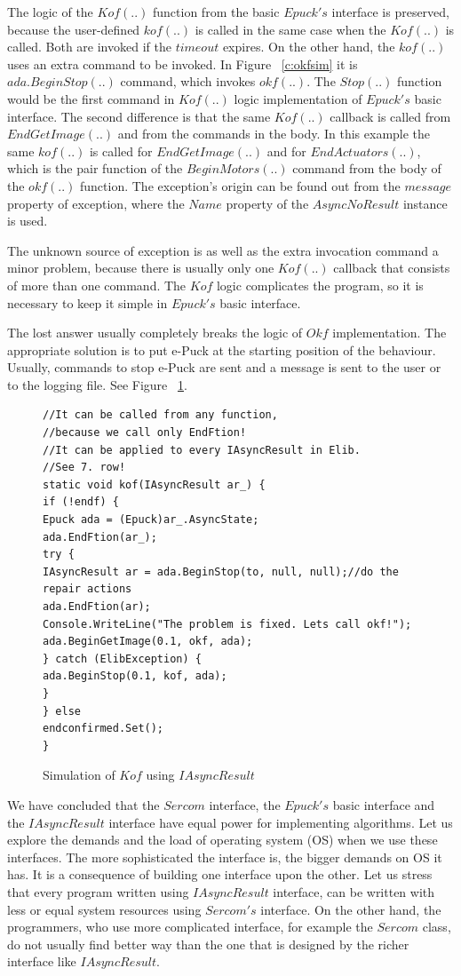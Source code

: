   The logic of the $Kof(..)$ function from the basic $Epuck's$ interface is preserved, because the user-defined
  $kof(..)$ is called in the same case when the $Kof(..)$ is called. Both are invoked if the $timeout$ expires.
  On the other hand, the $kof(..)$ uses an extra command to be invoked. In Figure ~\ref{c:okfsim} it
  is $ada.BeginStop(..)$ command, which invokes $okf(..)$. The $Stop(..)$ function would be the first command
  in $Kof(..)$ logic implementation of $Epuck's$ basic interface.
  The second difference is that the same $Kof(..)$ callback is called from $EndGetImage(..)$ and from the
  commands in the body. In this example the same $kof(..)$ is called for $EndGetImage(..)$ and 
  for $EndActuators(..)$, which is the pair function of the $BeginMotors(..)$ 
  command from the body of the $okf(..)$ function.
  The exception's origin can be found out from the $message$ property of exception, 
  where the $Name$ property of the $AsyncNoResult$ instance is used.

  The unknown source of exception is as well as the extra invocation command a minor problem, because
  there is usually only one $Kof(..)$ callback that consists of more than one command. 
  The $Kof$ logic complicates the program, so it is necessary to keep it simple in $Epuck's$ basic interface.

  The lost answer usually completely breaks the logic of $Okf$ implementation.
  The appropriate solution is to put e-Puck
  at the starting position of the behaviour. Usually, commands to stop e-Puck are sent 
  and a message is sent to the user or to the logging file.
  See Figure ~\ref{iasynckof}.

\begin{figure}[!hbp]
\begin{lstlisting}
//It can be called from any function,
//because we call only EndFtion!
//It can be applied to every IAsyncResult in Elib.
//See 7. row!
static void kof(IAsyncResult ar_) {
if (!endf) {
Epuck ada = (Epuck)ar_.AsyncState;
ada.EndFtion(ar_);
try {
IAsyncResult ar = ada.BeginStop(to, null, null);//do the repair actions
ada.EndFtion(ar);
Console.WriteLine("The problem is fixed. Lets call okf!");
ada.BeginGetImage(0.1, okf, ada);
} catch (ElibException) {
ada.BeginStop(0.1, kof, ada);
}
} else
endconfirmed.Set();
}
\end{lstlisting}
\caption{Simulation of $Kof$ using $IAsyncResult$}
\label{iasynckof}
\end{figure}

  We have concluded that the $Sercom$ interface, the $Epuck's$ basic interface and 
  the $IAsyncResult$ interface have equal power for implementing algorithms.
  Let us explore the demands and the load of operating system (OS) when we use these interfaces.
  The more sophisticated the interface is, the bigger demands on OS it has.
  It is a consequence of building one interface upon the other.
  Let us stress that every program written using $IAsyncResult$ interface, 
  can be written with less or equal system resources using $Sercom's$
  interface. On the other hand, the programmers, 
  who use more complicated interface, for example the $Sercom$ class, do not usually find better way 
  than the one that is designed by the richer interface like $IAsyncResult$.

